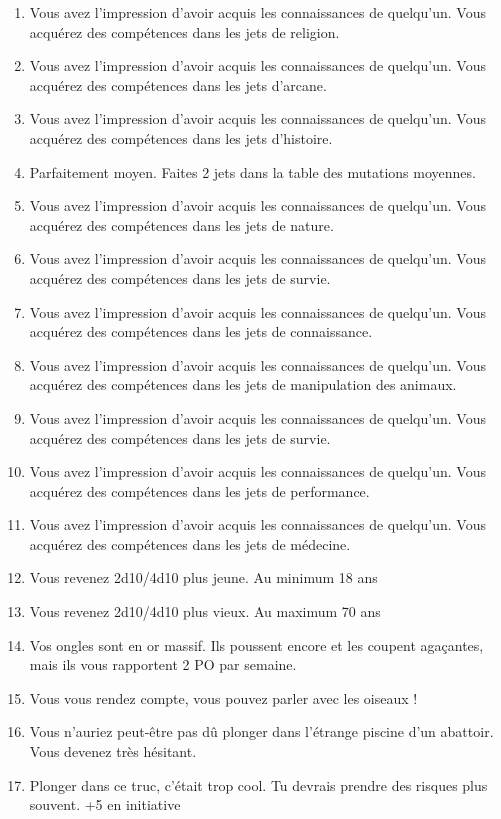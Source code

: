 \documentclass{article}
\begin{document}
\begin{enumerate}
	\item Vous avez l'impression d'avoir acquis les connaissances de quelqu'un. Vous acquérez des compétences dans les jets de religion.
	\item Vous avez l'impression d'avoir acquis les connaissances de quelqu'un. Vous acquérez des compétences dans les jets d’arcane.
	\item Vous avez l'impression d'avoir acquis les connaissances de quelqu'un. Vous acquérez des compétences dans les jets d’histoire.
	\item Parfaitement moyen. Faites 2 jets dans la table des mutations moyennes.
	\item Vous avez l'impression d'avoir acquis les connaissances de quelqu'un. Vous acquérez des compétences dans les jets de nature.
	\item Vous avez l'impression d'avoir acquis les connaissances de quelqu'un. Vous acquérez des compétences dans les jets de survie.
	\item Vous avez l'impression d'avoir acquis les connaissances de quelqu'un. Vous acquérez des compétences dans les jets de connaissance.
	\item Vous avez l'impression d'avoir acquis les connaissances de quelqu'un. Vous acquérez des compétences dans les jets de manipulation des animaux.
	\item Vous avez l'impression d'avoir acquis les connaissances de quelqu'un. Vous acquérez des compétences dans les jets de survie.
	\item Vous avez l'impression d'avoir acquis les connaissances de quelqu'un. Vous acquérez des compétences dans les jets de performance.
	\item Vous avez l'impression d'avoir acquis les connaissances de quelqu'un. Vous acquérez des compétences dans les jets de médecine.
	\item Vous revenez 2d10/4d10 plus jeune. Au minimum 18 ans
	\item Vous revenez 2d10/4d10 plus vieux. Au maximum 70 ans
	\item Vos ongles sont en or massif. Ils poussent encore et les coupent agaçantes, mais ils vous rapportent 2 PO par semaine.
	\item Vous vous rendez compte, vous pouvez parler avec les oiseaux !
	\item Vous n'auriez peut-être pas dû plonger dans l'étrange piscine d'un abattoir. Vous devenez très hésitant.
	\item Plonger dans ce truc, c'était trop cool. Tu devrais prendre des risques plus souvent. +5 en initiative

\end{enumerate}
\end{document}
